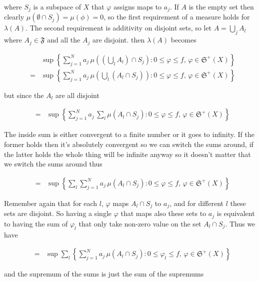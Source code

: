\documentclass[oneside]{book}
\begin{document}
\begin{enumerate}
where $S_j$ is a subspace of $X$ that $\varphi$ assigns maps to $a_j$. If $A$ is the empty set then clearly $\mu(\emptyset \cap S_j) = \mu(\phi) = 0$, so the first requirement of a measure holds for $\lambda(A)$. The second requirement is additivity on disjoint sets, so let $A=\bigcup_j A_l$ where $A_j \in \mathfrak{F}$ and all the $A_j$ are disjoint. then $\lambda(A)$ becomes

\begin{eqnarray}
&&\sup \left\{\sum_{j=1}^N a_j\, \mu \left( \left(\bigcup_l A_l \right) \cap S_j \right): 0 \le \varphi \le f,\, \varphi \in \mathfrak{S}^+(X) \right\} \nonumber \\
&=& \sup \left\{\sum_{j=1}^N a_j\, \mu \left( \bigcup_l (A_l \cap S_j) \right): 0 \le \varphi \le f,\, \varphi \in \mathfrak{S}^+(X) \right\}
\end{eqnarray}

but since the $A_l$ are all disjoint

\begin{eqnarray}
&=& \sup \left\{\sum_{j=1}^N a_j\, \sum_l \mu (A_l \cap S_j): 0 \le \varphi \le f,\, \varphi \in \mathfrak{S}^+(X) \right\}\nonumber
\end{eqnarray}

The inside sum is either convergent to a finite number or it goes to infinity. If the former holds then it's absolutely convergent so we can switch the sums around, if the latter holds the whole thing will be infinite anyway so it doesn't matter that we switch the sums around thus

\begin{eqnarray}
&=& \sup \left\{ \sum_l \sum_{j=1}^N a_j\, \mu (A_l \cap S_j): 0 \le \varphi \le f,\, \varphi \in \mathfrak{S}^+(X) \right\}\nonumber
\end{eqnarray}

Remember again that for each $l$, $\varphi$ maps $A_l \cap S_j$ to $a_j$, and for different $l$ these sets are disjoint. So having a single $\varphi$ that maps also these sets to $a_j$ is equivalent to having the sum of $\varphi_l$ that only take non-zero value on the set $A_l \cap S_j$. Thus we have

\begin{eqnarray}
&=& \sup \sum_l \left\{\sum_{j=1}^N a_j\, \mu (A_l \cap S_j): 0 \le \varphi_l \le f,\, \varphi \in \mathfrak{S}^+(X) \right\}\nonumber
\end{eqnarray}

and the supremum of the sums is just the sum of the supremums


\end{enumerate}
\end{document}
